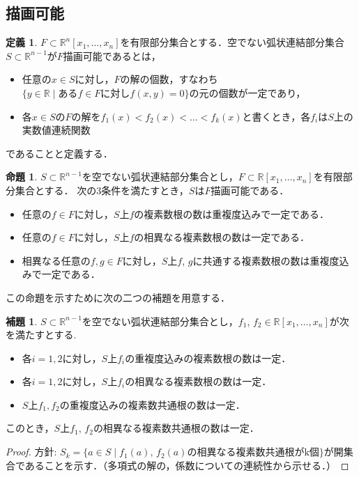 \documentclass[uplatex, dvipdfmx]{jsarticle}
\newcommand{\R}{\mathbb{R}}
\theoremstyle{definition}
\newtheorem{definition}{定義}[section]
\newtheorem{proposition}{命題}[section]
\newtheorem{lemma}{補題}[section]
\begin{document}
\subsection{描画可能}
\begin{definition}
$F \subset \R^n[x_1, \dots, x_n]$を有限部分集合とする．空でない弧状連結部分集合$S \subset \R^{n-1}$が$F$描画可能であるとは，
\begin{itemize}
	\item 任意の$ x \in S $に対し，$ F $の解の個数，すなわち$ \{y \in \mathbb{R} \mid \text{ある$f \in F$に対し$f(x,y) = 0$} \} $の元の個数が一定であり，
	\item 各$ x \in S $の$F$の解を$ f_1(x) < f_2(x) < \dots < f_k(x) $と書くとき，各$ f_i $は$ S $上の実数値連続関数
\end{itemize}
であることと定義する．
\end{definition}

\begin{proposition}\label{proposition:del}
$S \subset \R^{n-1}$を空でない弧状連結部分集合とし，$F \subset \R[x_1, \dots, x_n]$を有限部分集合とする．
次の3条件を満たすとき，$S$は$F$描画可能である．
\begin{itemize}
     \item 任意の$f \in F$に対し，$S$上$f$の複素数根の数は重複度込みで一定である．
     \item 任意の$f \in F$に対し，$S$上$f$の相異なる複素数根の数は一定である．
     \item 相異なる任意の$f, g \in F$に対し，$S$上$f$, $g$に共通する複素数根の数は重複度込みで一定である．
\end{itemize}
\end{proposition}

この命題を示すために次の二つの補題を用意する．

\begin{lemma}\label{lemma:del_1}
$S \subset \R^{n-1}$を空でない弧状連結部分集合とし，$f_1$, $f_2 \in \R[x_1, \dots, x_n]$が次を満たすとする.
\begin{itemize}
\item 各$i=1, 2$に対し，$S$上$f_i$の重複度込みの複素数根の数は一定．
\item 各$i=1, 2$に対し，$S$上$f_i$の相異なる複素数根の数は一定．
\item $S$上$f_1, f_2$の重複度込みの複素数共通根の数は一定．
\end{itemize}
このとき，$S$上$f_1$, $f_2$の相異なる複素数共通根の数は一定．
\end{lemma}
\begin{proof}
方針: $S_k = \{a \in S \mid \text{$f_1(a)$, $f_2(a)$の相異なる複素数共通根がk個} \}$が開集合であることを示す．（多項式の解の，係数についての連続性から示せる．）

\end{proof}
\end{document}
